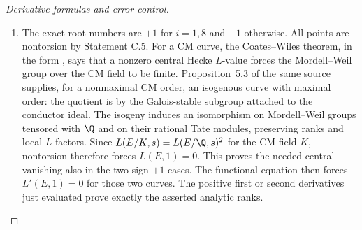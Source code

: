 \begin{proof}[Derivative formulas and error control]
\begin{enumerate}[label=\arabic*.,leftmargin=*]
\item The exact root numbers are $+1$ for $i=1,8$ and $-1$ otherwise.
All points are nontorsion by Statement C.5. For a CM curve,
the Coates--Wiles theorem, in the form
\citet[Theorem 10.1]{CrRubin1999}, says that a nonzero central
Hecke $L$-value forces the Mordell--Weil group over the CM field
to be finite. Proposition~5.3 of the same source supplies, for a nonmaximal CM order, an isogenous
curve with maximal order: the quotient is by the Galois-stable subgroup attached to the conductor ideal. The isogeny induces an isomorphism on Mordell--Weil groups tensored with $\Q$ and on their rational Tate modules, preserving ranks and local $L$-factors.
Since $L(E/K,s)=L(E/\Q,s)^2$ for the CM field $K$, nontorsion
therefore forces $L(E,1)=0$. This proves the needed central
vanishing also in the two sign-$+1$ cases. The functional equation
then forces $L'(E,1)=0$ for those two curves. The positive first
or second derivatives just evaluated prove exactly the asserted
analytic ranks.
\end{enumerate}

\end{proof}

